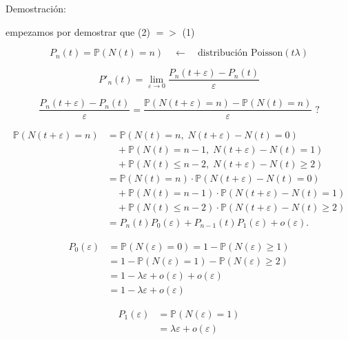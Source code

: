 \documentclass[12pt]{article}
\begin{document}
Demostración:

empezamos por demostrar que (2) $= >$ (1)

\begin{equation*}
P_n(t) = \mathbb{P}(N(t) = n) \quad \longleftarrow \quad \text{distribución Poisson}(t\lambda)
\end{equation*}

\begin{equation*}
P'_n(t) = \lim_{\varepsilon \to 0} \frac{P_n(t+\varepsilon) - P_n(t)}{\varepsilon}
\end{equation*}

\begin{equation*}
\frac{P_n(t+\varepsilon) - P_n(t)}{\varepsilon}
= \frac{\mathbb{P}(N(t+\varepsilon)=n) - \mathbb{P}(N(t)=n)}{\varepsilon}\; ?
\end{equation*}

\begin{align*}
\mathbb{P}(N(t+\varepsilon) = n) 
&= \mathbb{P}(N(t)=n,\; N(t+\varepsilon)-N(t)=0) \\
&\quad + \mathbb{P}(N(t)=n-1,\; N(t+\varepsilon)-N(t)=1) \\
&\quad + \mathbb{P}(N(t)\leq n-2,\; N(t+\varepsilon)-N(t)\geq 2) \\
&= \mathbb{P}(N(t)=n)\cdot \mathbb{P}(N(t+\varepsilon)-N(t)=0) \\
&\quad + \mathbb{P}(N(t)=n-1)\cdot \mathbb{P}(N(t+\varepsilon)-N(t)=1) \\
&\quad + \mathbb{P}(N(t)\leq n-2)\cdot \mathbb{P}(N(t+\varepsilon)-N(t)\geq 2) \\
&= P_n(t)P_0(\varepsilon) + P_{n-1}(t)P_1(\varepsilon) + o(\varepsilon).
\end{align*}


\begin{align*}
P_0(\varepsilon) &= \mathbb{P}(N(\varepsilon)=0) 
= 1 - \mathbb{P}(N(\varepsilon)\geq 1) \\
&= 1 - \mathbb{P}(N(\varepsilon)=1) - \mathbb{P}(N(\varepsilon)\geq 2) \\
&= 1 - \lambda \varepsilon + o(\varepsilon) + o(\varepsilon) \\
&= 1 - \lambda \varepsilon + o(\varepsilon)
\end{align*}

\begin{align*}
P_1(\varepsilon) &= \mathbb{P}(N(\varepsilon)=1) \\
&= \lambda \varepsilon + o(\varepsilon)
\end{align*}
\end{document}
